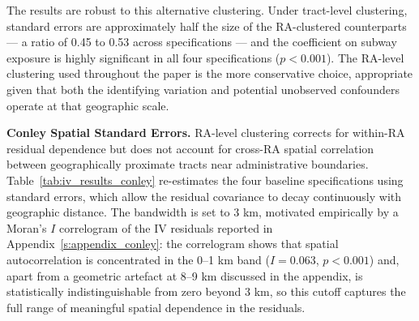 The results are robust to this alternative clustering. Under tract-level clustering, standard errors are approximately half the size of the RA-clustered counterparts --- a ratio of 0.45 to 0.53 across specifications --- and the coefficient on subway exposure is highly significant in all four specifications ($p < 0.001$). The RA-level clustering used throughout the paper is the more conservative choice, appropriate given that both the identifying variation and potential unobserved confounders operate at that geographic scale.

\vspace{0.75cm}

\noindent
\textbf{Conley Spatial Standard Errors.} RA-level clustering corrects for within-RA residual dependence but does not account for cross-RA spatial correlation between geographically proximate tracts near administrative boundaries. Table~\ref{tab:iv_results_conley} re-estimates the four baseline specifications using \citet{conley1999gmm} standard errors, which allow the residual covariance to decay continuously with geographic distance. The bandwidth is set to 3 km, motivated empirically by a Moran's $I$ correlogram of the IV residuals reported in Appendix~\ref{s:appendix_conley}: the correlogram shows that spatial autocorrelation is concentrated in the 0--1 km band ($I = 0.063$, $p < 0.001$) and, apart from a geometric artefact at 8--9 km discussed in the appendix, is statistically indistinguishable from zero beyond 3 km, so this cutoff captures the full range of meaningful spatial dependence in the residuals.

